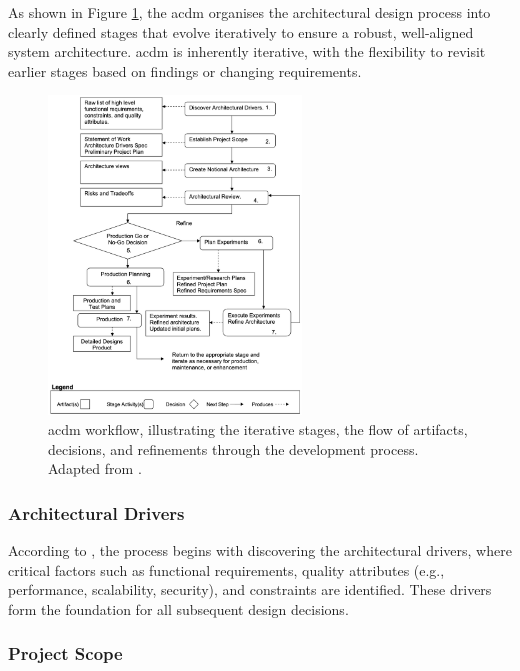 As shown in Figure \ref{fig:acdm_workflow}, the \ac{acdm} organises the architectural design process into clearly defined stages that evolve iteratively to ensure a robust, well-aligned system architecture. \ac{acdm} is inherently iterative, with the flexibility to revisit earlier stages based on findings or changing requirements.

\begin{figure}[!htb]
    \includegraphics[width=0.6\textwidth]{figs/chapter3/acdm_workflow.png}
    \centering
    \caption[\acl{acdm} Workflow]{\ac{acdm} workflow, illustrating the iterative stages, the flow of artifacts, decisions, and refinements through the development process. Adapted from .}
    \label{fig:acdm_workflow}
\end{figure}

\subsubsection{Architectural Drivers}

According to , the process begins with discovering the architectural drivers, where critical factors such as functional requirements, quality attributes (e.g., performance, scalability, security), and constraints are identified. These drivers form the foundation for all subsequent design decisions. 

\subsubsection{Project Scope}

